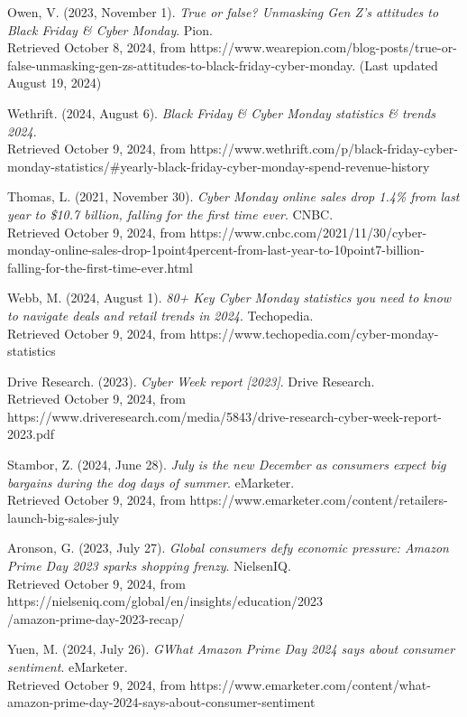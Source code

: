 \documentclass[12pt]{ctexart}
\begin{document}
\begin{thebibliography}{99}
     Owen, V. (2023, November 1). \textit{True or false? Unmasking Gen Z's attitudes to Black Friday \& Cyber Monday}. Pion. \\ Retrieved October 8, 2024, from https://www.wearepion.com/blog-posts/true-or-false-unmasking-gen-zs-attitudes-to-black-friday-cyber-monday. (Last updated August 19, 2024)

     Wethrift. (2024, August 6). \textit{Black Friday \& Cyber Monday statistics \& trends 2024}. \\ Retrieved October 9, 2024, from https://www.wethrift.com/p/black-friday-cyber-monday-statistics/\#yearly-black-friday-cyber-monday-spend-revenue-history
    
     Thomas, L. (2021, November 30). \textit{Cyber Monday online sales drop 1.4\% from last year to \$10.7 billion, falling for the first time ever}. CNBC.  \\ Retrieved October 9, 2024, from https://www.cnbc.com/2021/11/30/cyber-monday-online-sales-drop-1point4percent-from-last-year-to-10point7-billion-falling-for-the-first-time-ever.html

     Webb, M. (2024, August 1). \textit{80+ Key Cyber Monday statistics you need to know to navigate deals and retail trends in 2024}. Techopedia. \\ Retrieved October 9, 2024, from https://www.techopedia.com/cyber-monday-statistics

     Drive Research. (2023). \textit{Cyber Week report [2023]}. Drive Research. \\ Retrieved October 9, 2024, from https://www.driveresearch.com/media/5843/drive-research-cyber-week-report-2023.pdf

     Stambor, Z. (2024, June 28). \textit{July is the new December as consumers expect big bargains during the dog days of summer}. eMarketer. \\ Retrieved October 9, 2024, from https://www.emarketer.com/content/retailers-launch-big-sales-july

     Aronson, G. (2023, July 27). \textit{Global consumers defy economic pressure: Amazon Prime Day 2023 sparks shopping frenzy}. NielsenIQ.  \\ Retrieved October 9, 2024, from https://nielseniq.com/global/en/insights/education/2023 \\ /amazon-prime-day-2023-recap/

     Yuen, M. (2024, July 26).  \textit{GWhat Amazon Prime Day 2024 says about consumer sentiment}. eMarketer.  \\ Retrieved October 9, 2024, from https://www.emarketer.com/content/what-amazon-prime-day-2024-says-about-consumer-sentiment


\end{thebibliography}
\end{document}
